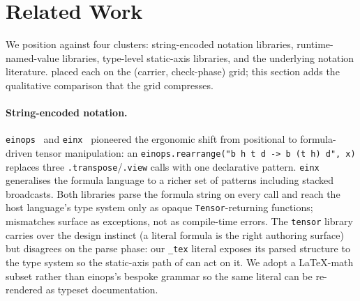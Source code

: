 \documentclass[10pt,twocolumn]{article}
\newcommand{\udltex}{\code{\_tex}}                            %
\newcommand{\code}[1]{\texttt{#1}}
\begin{document}
\section{Related Work}
\label{sec:related}

We position against four clusters: string-encoded notation libraries,
runtime-named-value libraries, type-level static-axis libraries, and
the underlying notation literature.  placed each
on the (carrier, check-phase) grid; this section adds the
qualitative comparison that the grid compresses.

\paragraph{String-encoded notation.}
\code{einops}~\cite{rogozhnikov2022einops} and \code{einx}~\cite{flick2026einx} pioneered the
ergonomic shift from positional to formula-driven tensor manipulation:
an \code{einops.rearrange("b h t d -> b (t h) d", x)} replaces three
\code{.transpose}/\code{.view} calls with one declarative pattern.
\code{einx} generalises the formula language to a richer set of
patterns including stacked broadcasts. Both libraries parse the
formula string on every call and reach the host language's type
system only as opaque \code{Tensor}-returning functions; mismatches
surface as exceptions, not as compile-time errors. The \code{tensor}
library carries over the design instinct (a literal formula is the
right authoring surface) but disagrees on the parse phase: our
\udltex{} literal exposes its parsed structure to the type system so
the static-axis path of  can act on it. We adopt a
LaTeX-math subset rather than einops's bespoke grammar so the same
literal can be re-rendered as typeset documentation.
\end{document}
